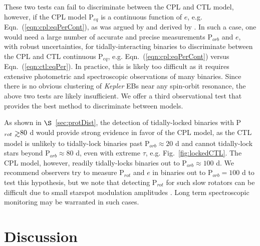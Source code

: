\documentclass[twocolumn]{aastex61}
\def\gsim{~\rlap{$>$}{\lower 1.0ex\hbox{$\sim$}}}
\newcommand{\kepler}[0]{\textit{Kepler}\xspace}
\begin{document}
These two tests can fail to discriminate between the CPL and CTL model, however, if the CPL model P$_{eq}$ is a continuous function of $e$, e.g. Eqn.~(\ref{eqn:cpl:eqPerCont}), as was argued by \citet{Goldreich1966b} and derived by \citet{Murray1999}.  In such a case, one would need a large number of accurate and precise measurements P$_{orb}$ and $e$, with robust uncertainties, for tidally-interacting binaries to discriminate between the CPL and CTL continuous P$_{eq}$, e.g. Eqn.~(\ref{eqn:cpl:eqPerCont}) versus Eqn.~(\ref{eqn:ctl:eqPer}).  In practice, this is likely too difficult as it requires extensive photometric and spectroscopic observations of many binaries. Since there is no obvious clustering of \kepler EBs near any spin-orbit resonance, the above two tests are likely insufficient. We offer a third observational test that provides the best method to discriminate between models.

As shown in $\S$~\ref{sec:protDist}, the detection of tidally-locked binaries with P$_{rot} \gsim 80$ d would provide strong evidence in favor of the CPL model, as the CTL model is unlikely to tidally-lock binaries past P$_{orb} \approx 20$ d and cannot tidally-lock stars beyond P$_{orb} \approx 80$ d, even with extreme $\tau$, e.g. Fig.~\ref{fig:lockedCTL}. The CPL model, however, readily tidally-locks binaries out to P$_{orb} \approx 100$ d.  We recommend observers try to measure P$_{rot}$ and $e$ in binaries out to P$_{orb} = 100$ d to test this hypothesis, but we note that detecting P$_{rot}$ for such slow rotators can be difficult due to small starspot modulation amplitudes \citep{Lurie2017,Reinhold2018}. Long term spectroscopic monitoring may be warranted in such cases.

\section{Discussion} \label{sec:discussion}
\end{document}
